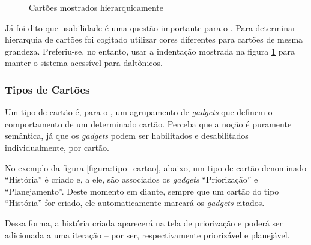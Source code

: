 \begin{figure}[H]
  \centering
  \caption{Cartões mostrados hierarquicamente}\label{figura:hierarquia}
\end{figure}

Já foi dito que usabilidade é uma questão importante para o \calopsita{}. Para determinar hierarquia de cartões foi cogitado utilizar cores diferentes para cartões de mesma grandeza. Preferiu-se, no entanto, usar a indentação mostrada na figura \ref{figura:hierarquia} para manter o sistema acessível para daltônicos.

\subsubsection*{Tipos de Cartões}

Um tipo de cartão é, para o \calopsita{}, um agrupamento de \textit{gadgets} que definem o comportamento de um determinado cartão. Perceba que a noção é puramente semântica, já que os \textit{gadgets} podem ser habilitados e desabilitados individualmente, por cartão.

No exemplo da figura \ref{figura:tipo_cartao}, abaixo, um tipo de cartão denominado ``História'' é criado e, a ele, são associados os \textit{gadgets} ``Priorização'' e ``Planejamento''. Deste momento em diante, sempre que um cartão do tipo ``História'' for criado, ele automaticamente marcará os \textit{gadgets} citados.

Dessa forma, a história criada aparecerá na tela de priorização e poderá ser adicionada a uma iteração -- por ser, respectivamente priorizável e planejável. 

